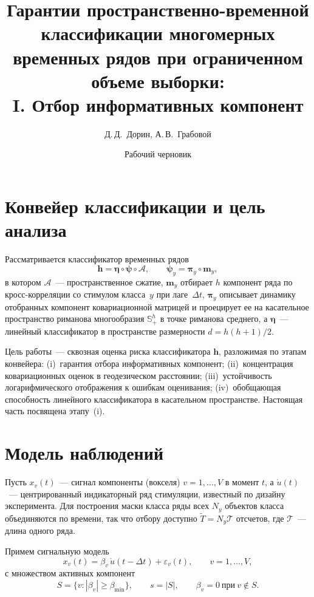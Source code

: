 \documentclass[12pt]{article}
\title{Гарантии пространственно-временной классификации многомерных временных рядов при ограниченном объеме выборки:\\ I. Отбор информативных компонент}
\author{Д.\,Д.~Дорин, А.\,В.~Грабовой}
\date{Рабочий черновик}
\theoremstyle{plain}
\theoremstyle{definition}
\begin{document}
\maketitle

\section{Конвейер классификации и цель анализа}

Рассматривается классификатор временных рядов
\[
\mathbf{h} = \boldsymbol{\eta} \circ \boldsymbol{\psi} \circ \mathcal{A},
\qquad
\boldsymbol{\psi}_y = \boldsymbol{\pi}_y \circ \mathbf{m}_y,
\]
в котором $\mathcal{A}$~--- пространственное сжатие, $\mathbf{m}_y$ отбирает $h$ компонент ряда по кросс-корреляции со стимулом класса~$y$ при лаге~$\Delta t$, $\boldsymbol{\pi}_y$ описывает динамику отобранных компонент ковариационной матрицей и проецирует ее на касательное пространство риманова многообразия $\mathbb{S}_{+}^{h}$ в точке риманова среднего, а $\boldsymbol{\eta}$~--- линейный классификатор в пространстве размерности $d = h(h+1)/2$.

Цель работы~--- сквозная оценка риска классификатора $\mathbf{h}$, разложимая по этапам конвейера:
(i)~гарантия отбора информативных компонент;
(ii)~концентрация ковариационных оценок в геодезическом расстоянии;
(iii)~устойчивость логарифмического отображения к ошибкам оценивания;
(iv)~обобщающая способность линейного классификатора в касательном пространстве.
Настоящая часть посвящена этапу~(i).

\section{Модель наблюдений}

Пусть $x_v(t)$~--- сигнал компоненты (вокселя) $v = 1, \ldots, V$ в момент $t$, а $\mathring{u}(t)$~--- центрированный индикаторный ряд стимуляции, известный по дизайну эксперимента. Для построения маски класса ряды всех $N_y$ объектов класса объединяются по времени, так что отбору доступно $\widetilde{T} = N_y \mathcal{T}$ отсчетов, где $\mathcal{T}$~--- длина одного ряда.

Примем сигнальную модель
\begin{equation}\label{eq:signal_model}
x_v(t) = \beta_v\, \mathring{u}(t - \Delta t) + \varepsilon_v(t),
\qquad v = 1, \ldots, V,
\end{equation}
с множеством активных компонент
\[
S = \{ v : |\beta_v| \ge \beta_{\min} \}, \qquad s = |S|,
\qquad \beta_v = 0 \ \text{при} \ v \notin S.
\]
\end{document}
